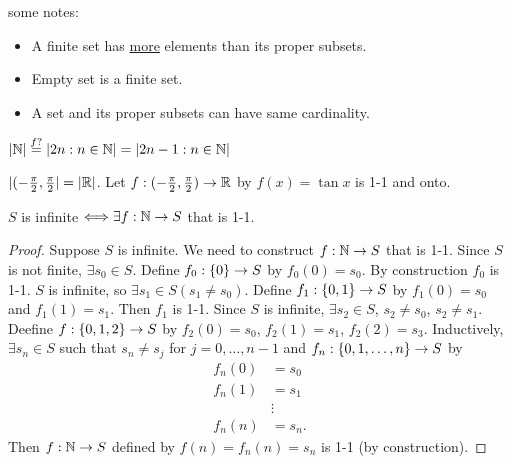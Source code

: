 \documentclass[]{article}
\begin{document}
\begin{note} some notes:
	\begin{itemize}
		\item A finite set has \ul{more} elements than its proper subsets.
		\item Empty set is a finite set.
		\item A set and its proper subsets can have same cardinality.
	\end{itemize}
\end{note}
\begin{example}
	$|\mathbb{N}|\overset{f?}{=} |2n:n\in\mathbb{N}| = |2n-1:n\in\mathbb{N}|$
\end{example}
\begin{example}
	$|(-\frac{\pi}{2},\frac{\pi}{2}| = |\mathbb{R}|$. Let $f:(-\frac{\pi}{2},\frac{\pi}{2}) \rightarrow \mathbb{R}$ by $f(x) = \tan x$ is 1-1 and onto.
\end{example}


\begin{proposition}
	$S$ is infinite $\Longleftrightarrow \exists f:\mathbb{N} \rightarrow S$ that is 1-1.
\end{proposition}
\begin{proof}
	\say{$\implies$} Suppose $S$ is infinite. We need to construct $f:\mathbb{N}\rightarrow S$ that is 1-1. Since $S$ is not finite, $\exists s_0\in S$.
	Define $f_0:\{0\}\rightarrow S$ by $f_0(0) = s_0$. By construction $f_0$ is 1-1.
	$S$ is infinite, so $\exists s_1\in S (s_1\neq s_0)$.
	Define $f_1:\{0,1\} \rightarrow S$ by $f_1(0) = s_0$ and $f_1(1) = s_1$.
	Then $f_1$ is 1-1. Since $S$ is infinite, $\exists s_2\in S$, $s_2\neq s_0$, $s_2\neq s_1$. Deefine $f:\{0,1,2\} \rightarrow S$ by $f_2(0) = s_0$, $f_2(1) = s_1$, $f_2(2) = s_3$.
	Inductively, $\exists s_n\in S$ such that $s_n\neq s_j$ for $j=0,\dots,n-1$ and $f_n : \{0,1,\dots,n\}\rightarrow S$ by
	\begin{align*}
		f_n(0) &= s_0 \\
		f_n(1) &= s_1 \\
		       &\vdots \\
		f_n(n) &= s_n.
	\end{align*}
	Then $f:\mathbb{N}\rightarrow S$ defined by $f(n) = f_n(n) = s_n$ is 1-1 (by construction).
\end{proof}
\end{document}
